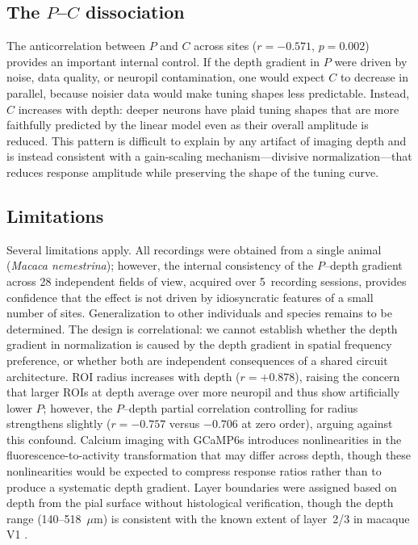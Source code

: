 \documentclass[11pt,letterpaper]{article}
\begin{document}
\subsection{The $P$--$C$ dissociation}

The anticorrelation between $P$ and $C$ across sites ($r = -0.571$,
$p = 0.002$) provides an important internal control. If the depth gradient in
$P$ were driven by noise, data quality, or neuropil contamination, one would
expect $C$ to decrease in parallel, because noisier data would make tuning
shapes less predictable. Instead, $C$ increases with depth: deeper neurons
have plaid tuning shapes that are more faithfully predicted by the linear
model even as their overall amplitude is reduced. This pattern is difficult to
explain by any artifact of imaging depth and is instead consistent with a
gain-scaling mechanism---divisive normalization---that reduces response
amplitude while preserving the shape of the tuning curve.

\subsection{Limitations}

Several limitations apply. All recordings were obtained from a single animal
(\textit{Macaca nemestrina}); however, the internal consistency of the
$P$--depth gradient across 28 independent fields of view, acquired over
5~recording sessions, provides confidence that the effect is not driven by
idiosyncratic features of a small number of sites. Generalization to other
individuals and species remains to be determined. The design is
correlational: we cannot establish whether the depth gradient in
normalization is caused by the depth gradient in spatial frequency
preference, or whether both are independent consequences of a shared circuit
architecture. ROI radius increases with depth ($r = +0.878$), raising the
concern that larger ROIs at depth average over more neuropil and thus show
artificially lower $P$; however, the $P$--depth partial correlation
controlling for radius strengthens slightly ($r = -0.757$ versus $-0.706$ at
zero order), arguing against this confound. Calcium imaging with GCaMP6s
introduces nonlinearities in the fluorescence-to-activity transformation that
may differ across depth, though these nonlinearities would be expected to
compress response ratios rather than to produce a systematic depth gradient.
Layer boundaries were assigned based on depth from the pial surface without
histological verification, though the depth range (140--518~$\mu$m) is
consistent with the known extent of layer~2/3 in macaque V1
\citep{lund1988}.
\end{document}
